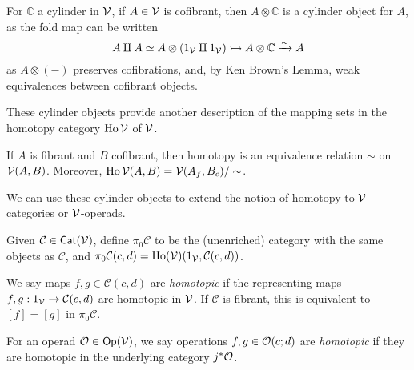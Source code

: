 \documentclass[a4paper,10pt
,draft
]{article}%
\renewcommand{\1}{\eta}%
\begin{document}

\begin{remark}
      \label{CYL_REM}
      For $\mathbb C$ a cylinder in $\mathcal V$,
      if $A \in \mathcal V$ is cofibrant, then $A \otimes \mathbb C$ is a cylinder object for $A$,
      as the fold map can be written
      \begin{equation}
            A \amalg A \simeq A \otimes (1_{\mathcal V} \amalg 1_{\mathcal V}) \rightarrowtail A \otimes \mathbb C \xrightarrow{\sim} A
      \end{equation}
      as $A \otimes (-)$ preserves cofibrations, and, by Ken Brown's Lemma, weak equivalences between cofibrant objects.
\end{remark}

These cylinder objects provide another description of the mapping sets in the homotopy category $\operatorname{Ho} \mathcal V$ of $\mathcal V$.

\begin{proposition}       
      If $A$ is fibrant and $B$ cofibrant, then
      homotopy is an equivalence relation $\sim$ on $\mathcal V(A,B)$.
      Moreover, 
      $\operatorname{Ho} \mathcal V (A,B) = \mathcal V(A_f, B_c)/\sim$.
\end{proposition}

We can use these cylinder objects to extend the notion of homotopy to $\mathcal V$-categories or $\mathcal V$-operads.

\begin{definition}
      \label{HTPY_DEFN}
      Given $\mathcal C \in \mathsf{Cat}(\mathcal V)$, define $\pi_0 \mathcal C$ to be the (unenriched) category with
      the same objects as $\mathcal C$, and $\pi_0 \mathcal C (c,d) = \operatorname{Ho}(\mathcal V)(1_{\mathcal V}, \mathcal C(c,d))$.

      We say maps $f,g \in \mathcal C(c,d)$ are \textit{homotopic}
      if the representing maps $f,g: 1_{\mathcal V} \to \mathcal C(c,d)$ are homotopic in $\mathcal V$.
      If $\mathcal C$ is fibrant, this is equivalent to $[f] = [g]$ in $\pi_0\mathcal C$.

      For an operad $\mathcal{O} \in \mathsf{Op}(\mathcal V)$, we say operations $f,g \in \mathcal{O}(c;d)$ are \textit{homotopic} if they are homotopic in the underlying category $j^{\**}\O$. 
\end{definition}
\end{document}
